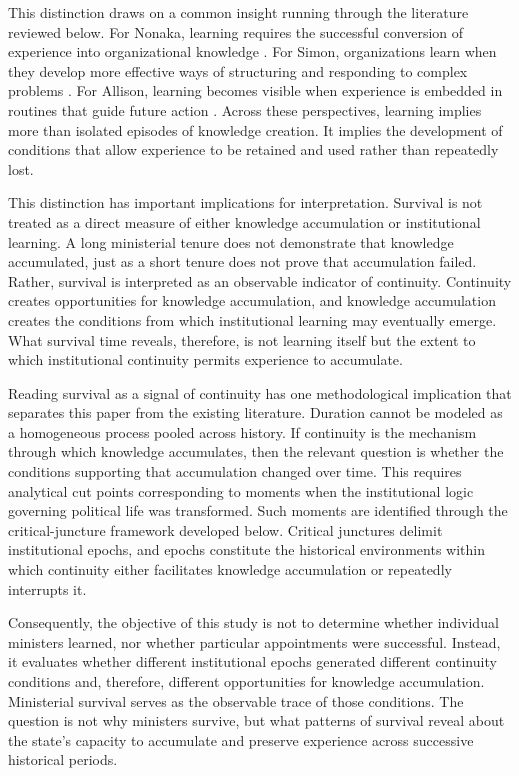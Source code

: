 \documentclass[doc, 12pt, a4paper,floatsintext]{apa7}
\begin{document}
This distinction draws on a common insight running through the literature reviewed below. For Nonaka, learning requires the successful conversion of experience into organizational knowledge \parencite{nonaka_knowledge-creating_1998}. For Simon, organizations learn when they develop more effective ways of structuring and responding to complex problems \parencite{foss_simon_2005}. For Allison, learning becomes visible when experience is embedded in routines that guide future action \parencite{allison_conceptual_1969}. Across these perspectives, learning implies more than isolated episodes of knowledge creation. It implies the development of conditions that allow experience to be retained and used rather than repeatedly lost.

This distinction has important implications for interpretation. Survival is not treated as a direct measure of either knowledge accumulation or institutional learning. A long ministerial tenure does not demonstrate that knowledge accumulated, just as a short tenure does not prove that accumulation failed. Rather, survival is interpreted as an observable indicator of continuity. Continuity creates opportunities for knowledge accumulation, and knowledge accumulation creates the conditions from which institutional learning may eventually emerge. What survival time reveals, therefore, is not learning itself but the extent to which institutional continuity permits experience to accumulate.

Reading survival as a signal of continuity has one methodological implication that separates this paper from the existing literature. Duration cannot be modeled as a homogeneous process pooled across history. If continuity is the mechanism through which knowledge accumulates, then the relevant question is whether the conditions supporting that accumulation changed over time. This requires analytical cut points corresponding to moments when the institutional logic governing political life was transformed. Such moments are identified through the critical-juncture framework developed below. Critical junctures delimit institutional epochs, and epochs constitute the historical environments within which continuity either facilitates knowledge accumulation or repeatedly interrupts it.

Consequently, the objective of this study is not to determine whether individual ministers learned, nor whether particular appointments were successful. Instead, it evaluates whether different institutional epochs generated different continuity conditions and, therefore, different opportunities for knowledge accumulation. Ministerial survival serves as the observable trace of those conditions. The question is not why ministers survive, but what patterns of survival reveal about the state's capacity to accumulate and preserve experience across successive historical periods.
\end{document}
